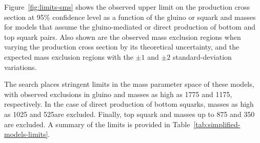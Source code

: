 Figure~\ref{fig:limits-sms} shows the observed upper limit on the
production cross section at 95\% confidence level as a function of the
gluino or squark and \chiz masses for models that assume the
gluino-mediated or direct production of bottom and top squark
pairs. Also shown are the observed mass exclusion regions when varying
the production cross section by its theoretical uncertainty, and the
expected mass exclusion regions with the ${\pm}1$ and ${\pm}2$
standard-deviation variations. 


The search places stringent limits in the mass parameter space of
these models, with observed exclusions in gluino and \chiz masses as
high as 1775 and 1175\GeV, respectively. In the case of direct
production of bottom squarks, masses as high as 1025 and 525\GeV are
excluded. Finally, top squark and \chiz masses up to 875 and 350\GeV
are excluded. A summary of the limits is provided in
Table~\ref{tab:simplified-models-limits}.

